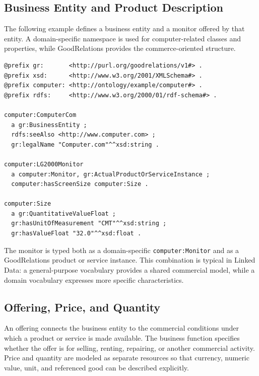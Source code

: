 \documentclass{scrbook}
\begin{document}
	\newpage
	\subsection{Business Entity and Product Description}
	
	The following example defines a business entity and a monitor offered by that entity. A domain-specific namespace is used for computer-related classes and properties, while GoodRelations provides the commerce-oriented structure.
	
	\begin{lstlisting}
@prefix gr:       <http://purl.org/goodrelations/v1#> .
@prefix xsd:      <http://www.w3.org/2001/XMLSchema#> .
@prefix computer: <http://ontology/example/computer#> .
@prefix rdfs:     <http://www.w3.org/2000/01/rdf-schema#> .
	
computer:ComputerCom
  a gr:BusinessEntity ;
  rdfs:seeAlso <http://www.computer.com> ;
  gr:legalName "Computer.com"^^xsd:string .
	
computer:LG2000Monitor
  a computer:Monitor, gr:ActualProductOrServiceInstance ;
  computer:hasScreenSize computer:Size .
	
computer:Size
  a gr:QuantitativeValueFloat ;
  gr:hasUnitOfMeasurement "CMT"^^xsd:string ;
  gr:hasValueFloat "32.0"^^xsd:float .
	\end{lstlisting}
	
	The monitor is typed both as a domain-specific \texttt{computer:Monitor} and as a GoodRelations product or service instance. This combination is typical in Linked Data: a general-purpose vocabulary provides a shared commercial model, while a domain vocabulary expresses more specific characteristics.
	
	\subsection{Offering, Price, and Quantity}
	
	An offering connects the business entity to the commercial conditions under which a product or service is made available. The business function specifies whether the offer is for selling, renting, repairing, or another commercial activity. Price and quantity are modeled as separate resources so that currency, numeric value, unit, and referenced good can be described explicitly.
	
\end{document}
